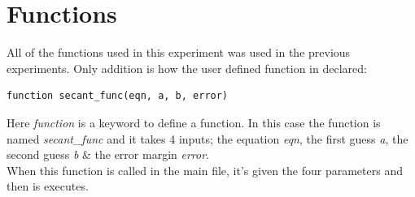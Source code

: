 \documentclass[12pt]{article}
\begin{document}
\section*{Functions}
All of the functions used in this experiment was used in the previous experiments. Only addition is how the user defined function in declared:
\begin{verbatim}
function secant_func(eqn, a, b, error)
\end{verbatim}
Here \emph{function} is a keyword to define a function. In this case the function is named \emph{secant\_func} and it takes 4 inputs; the equation \emph{eqn}, the first guess \emph{a}, the second guess \emph{b} \& the error margin \emph{error}.\\
When this function is called in the main file, it's given the four parameters and then is executes.
\pagebreak


\end{document}
